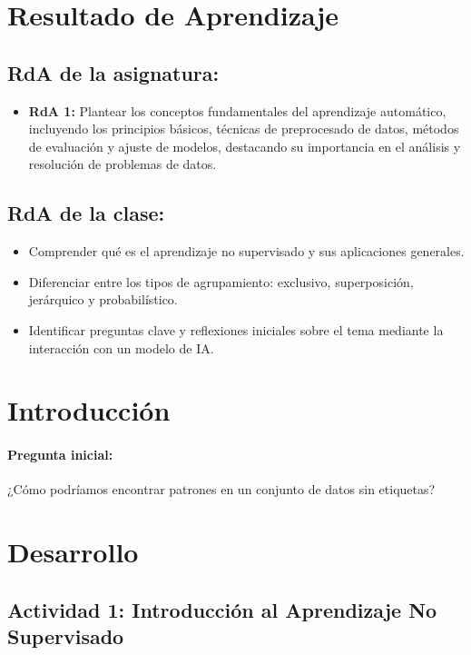 \documentclass[a4,11pt]{aleph-notas}
\begin{document}
\encabezado


\section*{Resultado de Aprendizaje}

\subsection*{RdA de la asignatura:}
\begin{itemize}[leftmargin=*]
    \item \textbf{RdA 1:} 
    Plantear los conceptos fundamentales del aprendizaje automático, incluyendo los principios básicos, técnicas de preprocesado de datos, métodos de evaluación y ajuste de modelos, destacando su importancia en el análisis y resolución de problemas de datos.
\end{itemize}

\subsection*{RdA de la clase:}
    \begin{itemize}[leftmargin=*]
        \item Comprender qué es el aprendizaje no supervisado y sus aplicaciones generales.
        \item Diferenciar entre los tipos de agrupamiento: exclusivo, superposición, jerárquico y probabilístico.
        \item Identificar preguntas clave y reflexiones iniciales sobre el tema mediante la interacción con un modelo de IA.
    \end{itemize}

\section*{Introducción}

\paragraph{Pregunta inicial:} 
¿Cómo podríamos encontrar patrones en un conjunto de datos sin etiquetas?

\section*{Desarrollo}

\subsection*{Actividad 1: Introducción al Aprendizaje No Supervisado}
\end{document}
